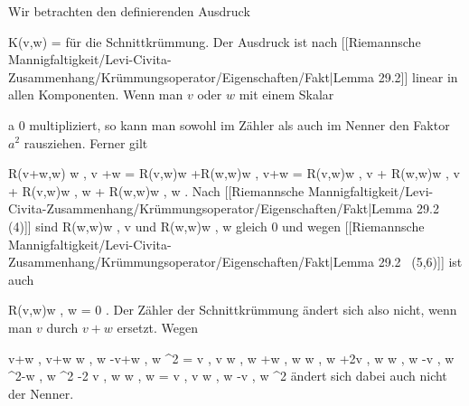 {

Wir betrachten den definierenden Ausdruck

\mavergleichskettedisp
{\vergleichskette
{ K(v,w)
}
{ =} { {  }
}
{ } {
}
{ } {
}
{ } {
}
}
{}{}{}
für die Schnittkrümmung. Der Ausdruck
 ist nach
[[Riemannsche Mannigfaltigkeit/Levi-Civita-Zusammenhang/Krümmungsoperator/Eigenschaften/Fakt|Lemma 29.2]]
linear in allen Komponenten. Wenn man $v$ oder $w$ mit einem Skalar

\mavergleichskette
{\vergleichskette
{ a
}
{ \neq }{ 0
}
{  }{
}
{    }{
}
{   }{
}
}
{}{}{}
multipliziert, so kann man sowohl im Zähler als auch im Nenner den Faktor $a^2$ rausziehen. Ferner gilt

\mavergleichskettealignhandlinks
{\vergleichskettealignhandlinks
{ \left\langle  R(v+w,w) w  , v +w   \right\rangle
}
{ =} { \left\langle  R(v,w)w +R(w,w)w  , v+w   \right\rangle
}
{ =} { \left\langle  R(v,w)w   , v   \right\rangle  +  \left\langle  R(w,w)w  ,  v   \right\rangle + \left\langle  R(v,w)w  ,  w   \right\rangle  +  \left\langle  R(w,w)w   , w   \right\rangle
}
{ } {
}
{ } {
}
}
{}
{}{.}
Nach
[[Riemannsche Mannigfaltigkeit/Levi-Civita-Zusammenhang/Krümmungsoperator/Eigenschaften/Fakt|Lemma 29.2  (4)]]
sind
\mathkor {} {\left\langle  R(w,w)w  ,  v   \right\rangle} {und} {\left\langle  R(w,w)w   , w   \right\rangle} {}
gleich $0$ und wegen
[[Riemannsche Mannigfaltigkeit/Levi-Civita-Zusammenhang/Krümmungsoperator/Eigenschaften/Fakt|Lemma 29.2  (5,6)]]
ist auch

\mavergleichskette
{\vergleichskette
{ \left\langle  R(v,w)w  ,  w   \right\rangle
}
{ = }{ 0
}
{  }{
}
{    }{
}
{   }{
}
}
{}{}{.}
Der Zähler der Schnittkrümmung ändert sich also nicht, wenn man $v$ durch $v+w$ ersetzt. Wegen

\mavergleichskettealigndrucklinks
{\vergleichskettealigndrucklinks
{ \left\langle v+w , v+w  \right\rangle \left\langle  w  , w  \right\rangle -\left\langle v+w , w  \right\rangle^2
}
{ =} { \left\langle  v  , v  \right\rangle  \left\langle  w  , w  \right\rangle+\left\langle  w  , w  \right\rangle \left\langle  w  , w  \right\rangle +2\left\langle  v  , w  \right\rangle \left\langle  w  , w  \right\rangle -\left\langle v  , w  \right\rangle^2-\left\langle w  , w  \right\rangle^2 -2 \left\langle v  , w  \right\rangle \left\langle w  , w  \right\rangle
}
{ =} { \left\langle  v  , v  \right\rangle \left\langle  w  , w  \right\rangle -\left\langle v  , w  \right\rangle^2
}
{ } {
}
{ } {
}
}
{}{}{}
ändert sich dabei auch nicht der Nenner.

}

